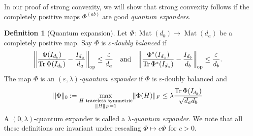 \documentclass[aos]{imsart}
\theoremstyle{definition}
\newtheorem{definition}[theorem]{Definition}
\numberwithin{equation}{section}
\DeclareMathOperator{\op}{op}
\DeclareMathOperator{\Mat}{Mat}
\DeclareMathOperator{\tr}{Tr}
\DeclareMathOperator{\vect}{vec}
\DeclarePairedDelimiter{\norm}{\lVert}{\rVert}
\newcommand{\ot}{\otimes}
\newcommand{\eps}{\varepsilon}
\begin{document}
%
In our proof of strong convexity, we will show that strong convexity follows if the completely positive maps $\Phi^{(ab)}$ are good \emph{quantum expanders}.

\begin{definition}[Quantum expansion]
Let $\Phi\colon\Mat(d_b) \to \Mat(d_a)$ be a completely positive map.
Say $\Phi$ is \emph{$\eps$-doubly balanced} if
\begin{align}\label{eq:doubly balanced}
  \norm*{\frac{\Phi(I_{d_b})}{\tr \Phi(I_{d_b})} - \frac{I_{d_a}}{d_a}}_{\op} \leq \frac\eps{d_a}
\quad\text{and}\quad
  \norm*{\frac{\Phi^*(I_{d_a})}{\tr \Phi^*(I_{d_a})} - \frac{I_{d_b}}{d_b}}_{\op} \leq \frac\eps{d_b}.
\end{align}
The map $\Phi$ is an \emph{$(\eps, \lambda)$-quantum expander} if $\Phi$ is $\eps$-doubly balanced and
\begin{align}\label{eq:expansion}
  \norm{\Phi}_0 := \max_{\substack{H \text{ traceless symmetric} \\ \norm H_F=1}} \norm{\Phi(H)}_F
\leq \lambda \frac{\tr \Phi(I_{d_b})}{\sqrt{d_ad_b}}
\end{align}
A $(0, \lambda)$-quantum expander is called a \emph{$\lambda$-quantum expander}.
We note that all these definitions are invariant under rescaling $\Phi \mapsto c\Phi$ for $c>0$.
\end{definition}
\end{document}

